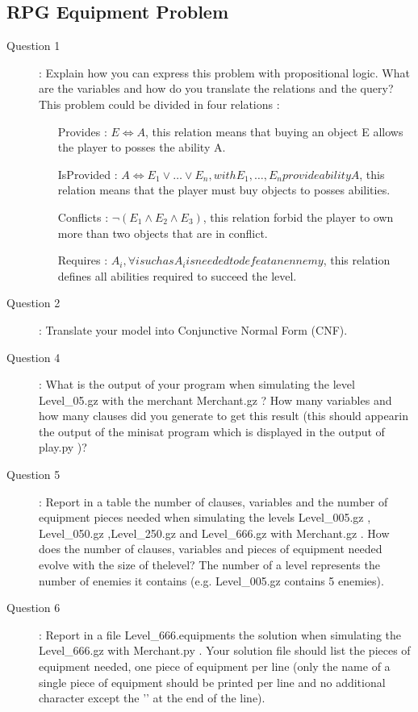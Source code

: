\subsection{RPG Equipment Problem}
\begin{description}
\item[Question 1]: Explain how you can express this problem with propositional logic. What are the variables and how do you translate the relations and the query?\\
This problem could be divided in four relations : 
\begin{itemize}
\item[Provides]: $E \Leftrightarrow A$, this relation means that buying an object E allows the player to posses the ability A.
\item[IsProvided]: $A  \Leftrightarrow E_1 \vee \ldots \vee E_n, with E_1,\ldots,E_n provide ability A$, this relation means that the player must buy objects to posses abilities.
\item[Conflicts]: $ \neg (E_1 \wedge E_2 \wedge E_3) $, this relation forbid the player to own more than two objects that are in conflict.
\item[Requires]: $ A_i, \forall i such as A_i is needed to defeat an ennemy$, this relation defines all abilities required to succeed the level.
\end{itemize}
\item[Question 2]: Translate your model into Conjunctive Normal Form (CNF).\\


\item[Question 4]: What is the output of your program when simulating the level Level_05.gz with the merchant Merchant.gz ? How many variables and how many clauses did you generate to get this result (this should appearin the output of the minisat program which is displayed in the output of play.py )?\\

\item[Question 5]: Report in a table the number of clauses, variables and the number of equipment pieces needed when simulating the levels Level_005.gz , Level_050.gz ,Level_250.gz and Level_666.gz with Merchant.gz . How does the number of clauses, variables and pieces of equipment needed evolve with the size of thelevel? The number of a level represents the number of enemies it contains (e.g. Level_005.gz contains 5 enemies).\\

\item[Question 6]: Report in a file Level_666.equipments the solution when simulating the Level_666.gz with Merchant.py . Your solution file should list the pieces of equipment needed, one piece of equipment per line (only the name of a single piece of equipment should be printed per line and no additional character except the ’\n’ at the end of the line).\\


\end{description}



